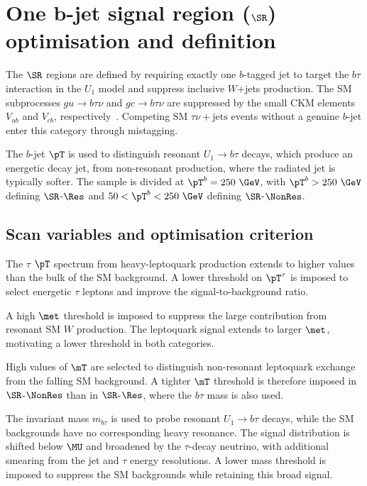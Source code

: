 \section[One b-jet signal region (SR1b) optimisation and definition]{One b-jet signal region ($\SR$) optimisation and definition}
\label{sec:ch7_sr1b}

The $\SR$ regions are defined by requiring exactly one $b$-tagged jet to target the $b\tau$ interaction in the $U_1$ model and suppress inclusive $W$+jets production.
The SM subprocesses $gu\to b\tau\nu$ and $gc\to b\tau\nu$ are suppressed by the small CKM elements $V_{ub}$ and $V_{cb}$, respectively~\cite{Endo2022NonResonant}.
Competing SM $\tau\nu+\mathrm{jets}$ events without a genuine $b$-jet enter this category through mistagging.

The $b$-jet $\pT$ is used to distinguish resonant $U_1\to b\tau$ decays, which produce an energetic decay jet, from non-resonant production, where the radiated jet is typically softer.
The sample is divided at $\pT^b=250~\GeV$, with $\pT^b>250~\GeV$ defining $\SR$-$\Res$ and $50<\pT^b<250~\GeV$ defining $\SR$-$\NonRes$.

\subsection{Scan variables and optimisation criterion}
\label{subsec:ch7_scan}

The $\tau$ $\pT$ spectrum from heavy-leptoquark production extends to higher values than the bulk of the SM background.
A lower threshold on $\pT^\tau$ is imposed to select energetic $\tau$ leptons and improve the signal-to-background ratio.

A high $\met$ threshold is imposed to suppress the large contribution from resonant SM $W$ production.
The leptoquark signal extends to larger $\met$, motivating a lower threshold in both categories.

High values of $\mT$ are selected to distinguish non-resonant leptoquark exchange from the falling SM background.
A tighter $\mT$ threshold is therefore imposed in $\SR$-$\NonRes$ than in $\SR$-$\Res$, where the $b\tau$ mass is also used.

The invariant mass $m_{b\tau}$ is used to probe resonant $U_1\to b\tau$ decays, while the SM backgrounds have no corresponding heavy resonance.
The signal distribution is shifted below $\MU$ and broadened by the $\tau$-decay neutrino, with additional smearing from the jet and $\tau$ energy resolutions.
A lower mass threshold is imposed to suppress the SM backgrounds while retaining this broad signal.

